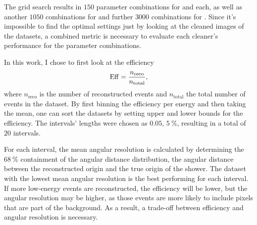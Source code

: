 
The grid search results in \(\num{150}\) parameter combinations for \tailcuts{} and \mars{} each,
as well as another \(\num{1050}\) combinations for \fact{} and further \(\num{3000}\) combinations for \tcc{}.
Since it's impossible to find the optimal settings just by looking at the
cleaned images of the datasets, a combined metric is necessary to evaluate each cleaner's performance
for the parameter combinations.

In this work, I chose to first look at the efficiency
\begin{equation}\label{eq:efficiency}
    \operatorname{Eff} =  \frac{n_{\mathrm{reco}}}{n_{\mathrm{total}}},
\end{equation}
where \(n_{\mathrm{reco}}\) is the number of reconstructed events and \(n_{\mathrm{total}}\)
the total number of events in the dataset. By first binning the efficiency per energy and then
taking the mean, one can sort the datasets by setting upper and lower bounds for the efficiency.
The intervals' lengths were chosen as \(\num{0.05}\), \ie \(\SI{5}{\percent}\), resulting in a total
of \(\num{20}\) intervals.

For each interval, the mean angular resolution is calculated by determining the
\(\SI{68}{\percent}\) containment of the angular distance distribution, \ie the angular distance
between the reconstructed origin and the true origin of the shower.
The dataset with the lowest mean angular resolution is the best performing for each interval.
If more low-energy events are reconstructed, the efficiency will be lower, but the angular resolution
may be higher, as those events are more likely to include pixels that are part of the background.
As a result, a trade-off between efficiency and angular resolution is necessary.

